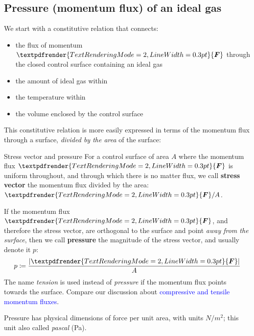 \documentclass[a4paper,12pt,%
onecolumn,oneside,titlepage,%
british%
]{memoir}
\renewcommand*{\bm}[1]{\textpdfrender{TextRenderingMode=2,LineWidth=0.3pt}{\boldsymbol{#1}}}
\newcommand*{\defd}{\coloneqq}
\DeclarePairedDelimiter\abs{\lvert}{\rvert}
\renewcommand*{\|}[1][]{\nonscript\:#1\vert\nonscript\:\mathopen{}}
\newcommand*{\sect}{\S}%
\renewcommand*{\autoref}[2]{\sidepar{\vspace{-1ex}\footnotesize{\color{blue}\faIcon{%
reply%
}\enspace\sect\,\ref{#1} page\,\pageref{#1}}}\textcolor{blue}{#2}}
\newcommand*{\yF}{\bm{F}}
\begin{document}

\subsection{Pressure (momentum flux) of an ideal gas}
\label{sec:pressure_ideal_gas}

We start with a constitutive relation that connects:
\begin{itemize}[nosep]
\item the flux of momentum $\yF$ through the closed control surface containing an ideal gas
\item the amount of ideal gas within
\item the temperature within
\item the volume enclosed by the control surface
\end{itemize}

This constitutive relation is more easily expressed in terms of the momentum flux through a surface, \emph{divided by the area} of the surface:
\begin{definition}{Stress vector and pressure}
  For a control surface of area $A$ where the momentum flux $\yF$ is uniform throughout, and through which there is no matter flux, we call \textbf{stress vector} the momentum flux divided by the area: $\yF/A$.

  \smallskip

If the momentum flux $\yF$, and therefore the stress vector, are orthogonal to the surface and point \emph{away from the surface}, then we call \textbf{pressure} the magnitude of the stress vector, and usually denote it $p$:
\begin{equation}
  \label{eq:pressure_def}
  p \defd \frac{\abs{\yF}}{A}
\end{equation}
The name \emph{tension} is used instead of \emph{pressure} if the momentum flux points towards the surface. Compare our discussion about \autoref{sec:pressure_tension_shear}{compressive and tensile momentum fluxes}.

\smallskip

Pressure has physical dimensions of force per unit area, with units $\unit{N/m^{2}}$; this unit also called \emph{pascal} (\unit{Pa}).
\end{definition}
\end{document}

